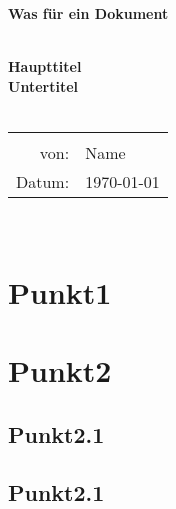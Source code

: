 \documentclass[
    ngerman,
    a4paper,
    headsepline,
    footsepline,
    12pt
    ]{scrartcl}
\newcommand{\art}{Was für ein Dokument}
\renewcommand{\author}{Name}
\newcommand{\thema}{{\Huge Haupttitel} \\[2em]
    Untertitel}
\begin{document}
    \begin{titlepage}
    \centering

        \colorbox{Green}{\hspace{30em}}
        \begin{center}
        {\LARGE \bf \art }
        \end{center}
        \colorbox{Green}{\hspace{30em}}

        ~\\[8em]


        {\LARGE \bf \thema} \\[1cm]
        ~\\[5em]
        \begin{tabular}{rl}
            \hline \\
            von:  & \quad \author \\[0.5em]
            Datum: & \quad \today \\[0.5em]
        \end{tabular}
        \\[10em]

        \colorbox{lightgray}{\hspace{30em}}
    \end{titlepage}

    \clearpage

    \tableofcontents

    \newpage



\section{Punkt1}

\section{Punkt2}
\subsection{Punkt2.1}
\subsection{Punkt2.1}
\end{document}
